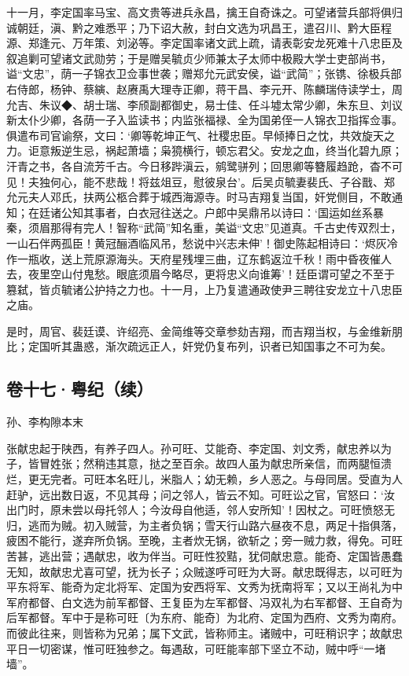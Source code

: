 \documentclass[]{article}
\begin{document}
十一月，李定国率马宝、高文贵等进兵永昌，擒王自奇诛之。可望诸营兵部将俱归诚朝廷，滇、黔之难悉平；乃下诏大赦，封白文选为巩昌王，遣召川、黔大臣程源、郑逢元、万年策、刘泌等。李定国率诸文武上疏，请表彰安龙死难十八忠臣及叙追剿可望诸文武勋劳；于是赠吴毓贞少师兼太子太师中极殿大学士吏部尚书，谥``文忠''，荫一子锦衣卫佥事世袭；赠郑允元武安侯，谥``武简''；张镌、徐极兵部右侍郎，杨钟、蔡縯、赵赓禹大理寺正卿，蒋干昌、李元开、陈麟瑞侍读学士，周允吉、朱议◆、胡士瑞、李颀副都御史，易士佳、任斗墟太常少卿，朱东旦、刘议新太仆少卿，各荫一子入监读书；内监张福禄、全为国弟侄一人锦衣卫指挥佥事。俱遣布司官谕祭，文曰：`卿等乾坤正气、社稷忠臣。早倾捧日之忱，共效旋天之力。讵意叛逆生忌，祸起萧墙；枭獍横行，顿忘君父。安龙之血，终当化碧九原；汗青之书，各自流芳千古。今日移跸滇云，鹓鹭骈列；回思卿等簪履趋跄，杳不可见！夫独何心，能不悲哉！将兹俎豆，慰彼泉台'。后吴贞毓妻裴氏、子谷戬、郑允元夫人邓氏，扶两公柩合葬于城西海源寺。时马吉翔复当国，奸党侧目，不敢通知；在廷诸公知其事者，白衣冠往送之。户郎中吴鼎吊以诗曰：`国运如丝系暴秦，须眉那得有完人！智称``武简''知名重，美谥``文忠''见道真。千古史传双烈士，一山石伴两孤臣！黄冠酾酒临风吊，愁说中兴志未伸'！御史陈起相诗曰：`烬灰冷作一瓶收，送上荒原源海头。天府星残埋三曲，辽东鹤返泣千秋！雨中昏夜催人去，夜里空山付鬼愁。眼底须眉今略尽，更将忠义向谁筹'！廷臣谓可望之不至于篡弑，皆贞毓诸公护持之力也。十一月，上乃复遣通政使尹三聘往安龙立十八忠臣之庙。

是时，周官、裴廷谟、许绍亮、金简维等交章参劾吉翔，而吉翔当权，与金维新朋比；定国听其蛊惑，渐次疏远正人，奸党仍复布列，识者已知国事之不可为矣。

\hypertarget{header-n97}{%
\subsection{卷十七·粤纪（续）}\label{header-n97}}

孙、李构隙本末

张献忠起于陕西，有养子四人。孙可旺、艾能奇、李定国、刘文秀，献忠养以为子，皆冒姓张；然稍违其意，挞之至百余。故四人虽为献忠所亲信，而两腿恒溃烂，更无完者。可旺本名旺儿，米脂人；幼无赖，乡人恶之。与母同居。受直为人赶驴，远出数日返，不见其母；问之邻人，皆云不知。可旺讼之官，官怒曰：`汝出门时，原未尝以母托邻人；今汝母自他适，邻人安所知'！因杖之。可旺愤怒无归，逃而为贼。初入贼营，为主者负锅；雪天行山路六昼夜不息，两足十指俱落，疲困不能行，遂弃所负锅。至晚，主者炊无锅，欲斩之；旁一贼力救，得免。可旺苦甚，逃出营；遇献忠，收为伴当。可旺性狡黠，犹伺献忠意。能奇、定国皆愚蠢无知，故献忠尤喜可望，抚为长子；众贼遂呼可旺为大哥。献忠既得志，以可旺为平东将军、能奇为定北将军、定国为安西将军、文秀为抚南将军；又以王尚礼为中军府都督、白文选为前军都督、王复臣为左军都督、冯双礼为右军都督、王自奇为后军都督。军中于是称可旺〔为东府、能奇〕为北府、定国为西府、文秀为南府。而彼此往来，则皆称为兄弟；属下文武，皆称师主。诸贼中，可旺稍识字；故献忠平日一切密谋，惟可旺独参之。每遇敌，可旺能率部下坚立不动，贼中呼``一堵墙''。
\end{document}
